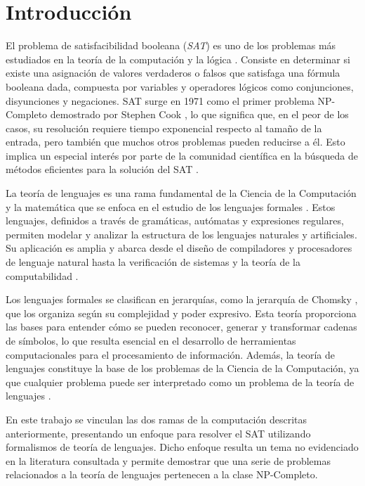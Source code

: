 \chapter*{Introducción}

El problema de satisfacibilidad booleana (\textit{SAT}) \cite{authomataTheory} es uno de los problemas más estudiados en 
la teoría de la computación y la lógica \cite{biere2021handbook}.  Consiste en determinar si existe una asignación 
de valores verdaderos o falsos que satisfaga una fórmula booleana dada, compuesta por variables y operadores 
lógicos como conjunciones, disyunciones y negaciones. SAT surge en 1971 como el primer problema NP-Completo 
demostrado por Stephen Cook \cite{Cook1971}, lo que significa que, en el peor de los casos, su resolución 
requiere tiempo exponencial respecto al tamaño de la entrada, pero también que muchos otros problemas pueden 
reducirse a él. Esto implica un especial interés por parte de la comunidad científica en la búsqueda de 
métodos eficientes para la solución del SAT \cite{biere2021handbook}.

La teoría de lenguajes es una rama fundamental de la Ciencia de la Computación y la matemática que se enfoca 
en el estudio de los lenguajes formales \cite{authomataTheory}. Estos lenguajes, definidos a través de 
gramáticas, autómatas y expresiones regulares, permiten modelar y analizar la estructura de los lenguajes 
naturales y artificiales. Su aplicación es amplia y abarca desde el diseño de compiladores y procesadores de 
lenguaje natural hasta la verificación de sistemas y la teoría de la computabilidad \cite{authomataTheory}.

Los lenguajes formales se clasifican en jerarquías, como la jerarquía de Chomsky \cite{hunter2020chomsky}, 
que los organiza según su complejidad y poder expresivo. Esta teoría proporciona las bases para 
entender cómo se pueden reconocer, generar y transformar cadenas de símbolos, lo que resulta esencial 
en el desarrollo de herramientas computacionales para el procesamiento de información. Además, 
la teoría de lenguajes constituye la base de los problemas de la Ciencia de la Computación, ya que 
cualquier problema puede ser interpretado como un problema de la teoría de lenguajes \cite{authomataTheory}.

En este trabajo se vinculan las dos ramas de la computación descritas anteriormente, presentando 
un enfoque para resolver el SAT utilizando formalismos de teoría de lenguajes. Dicho enfoque resulta un 
tema no evidenciado en la literatura consultada y permite demostrar que una serie de problemas 
relacionados a la teoría de lenguajes pertenecen a la clase NP-Completo.

